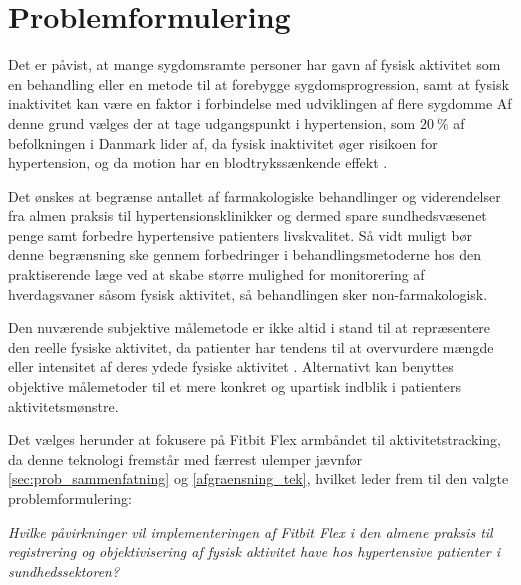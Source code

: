 \section{Problemformulering}


Det er påvist, at mange sygdomsramte personer har gavn af fysisk aktivitet som en behandling eller en metode til at forebygge sygdomsprogression, samt at fysisk inaktivitet kan være en faktor i forbindelse med udviklingen af flere sygdomme \citep{motionsraad2007,pedersen2011}
Af denne grund vælges der at tage udgangspunkt i hypertension, som $20~\%$ af befolkningen i Danmark lider af, da fysisk inaktivitet øger risikoen for hypertension, og da motion har en blodtrykssænkende effekt \citep{pedersen2011,olsen2015}. 

Det ønskes at begrænse antallet af farmakologiske behandlinger og viderendelser fra almen praksis til hypertensionsklinikker og dermed spare sundhedsvæsenet penge samt forbedre hypertensive patienters livskvalitet. Så vidt muligt bør denne begrænsning ske gennem forbedringer i behandlingsmetoderne hos den praktiserende læge ved at skabe større mulighed for monitorering af hverdagsvaner såsom fysisk aktivitet, så behandlingen sker non-farmakologisk.

Den nuværende subjektive målemetode er ikke altid i stand til at repræsentere den reelle fysiske aktivitet, da patienter har tendens til at overvurdere mængde eller intensitet af deres ydede fysiske aktivitet \citep{motionsraad2007,pedersen2011,adamo2009}. Alternativt kan benyttes objektive målemetoder til et mere konkret og upartisk indblik i patienters aktivitetsmønstre. 

Det vælges herunder at fokusere på Fitbit Flex armbåndet til aktivitetstracking, da denne teknologi fremstår med færrest ulemper jævnfør \autoref{sec:prob_sammenfatning} og \autoref{afgraensning_tek}, hvilket leder frem til den valgte problemformulering: 


\begin{center}
\textit{Hvilke påvirkninger vil implementeringen af Fitbit Flex i den almene praksis til registrering og objektivisering af fysisk aktivitet have hos hypertensive patienter i sundhedssektoren?}
\end{center}